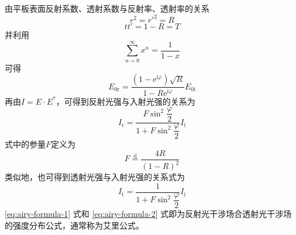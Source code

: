 \documentclass[cn,10pt,chinesefont=founder,math=mtpro2,cite=super,toc=onecol,twoside]{elegantbook}
\begin{document}
由平板表面反射系数、透射系数与反射率、透射率的关系
\begin{equation}
r^2=r'^2=R
\end{equation}
\begin{equation}
tt'=1-R=T
\end{equation}
并利用
\begin{equation}
\sum_{n=0}^{\infty}x^n=\frac{1}{1-x}
\end{equation}
可得
\begin{equation}
E_{0\mathrm{r}}=\frac{(1-\mathrm{e}^{\mathrm{i}\varphi})\sqrt{R}}{1-R\mathrm{e}^{\mathrm{i}\varphi}}E_{0\mathrm{i}}
\end{equation}
再由$I=E\cdot E^*$，可得到反射光强与入射光强的关系为
\begin{equation}
I_{\mathrm{r}}=\frac{F\sin^2\dfrac{\varphi}{2}}{1+F\sin^2\dfrac{\varphi}{2}}I_{\mathrm{i}}
\label{eq:airy-formula-1}
\end{equation}
式中的参量$F$定义为
\begin{equation}
F\overset{\text{d}}{=}\frac{4R}{(1-R)^2}
\end{equation}
类似地，也可得到透射光强与入射光强的关系式为
\begin{equation}
I_{\mathrm{t}}=\frac{1}{1+F\sin^2\dfrac{\varphi}{2}}I_{\mathrm{i}}
\label{eq:airy-formula-2}
\end{equation}
\eqref{eq:airy-formula-1} 式和 \eqref{eq:airy-formula-2} 式即为反射光干涉场合透射光干涉场的强度分布公式，通常称为艾里公式。
\end{document}
